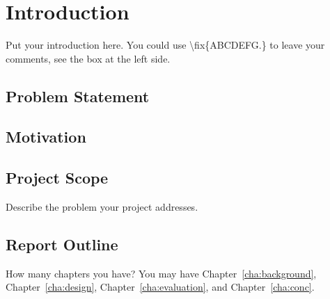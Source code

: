 \chapter{Introduction}
\label{cha:intro}

Put your introduction here. You could use \textbackslash fix\{ABCDEFG.\}
to leave your comments, see the box at the left side.



\section{Problem Statement}
\label{sec:problemstatement}



\section{Motivation}
\label{sec:motivations}


\section{Project Scope}
\label{sec:projectscope}
Describe the problem your project addresses.


\section{Report Outline}
\label{sec:outline}

How many chapters you have? You may have Chapter~\ref{cha:background},
Chapter~\ref{cha:design}, Chapter~\ref{cha:evaluation},
and Chapter~\ref{cha:conc}.
